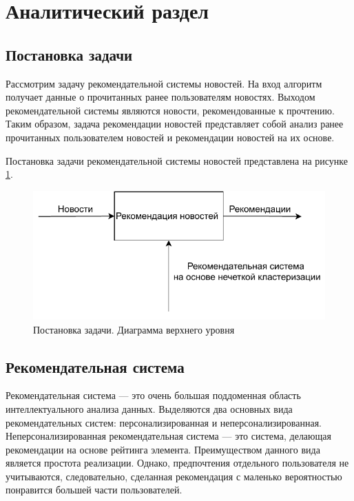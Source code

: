 \section{Аналитический раздел}
 
\subsection{Постановка задачи}

Рассмотрим задачу рекомендательной системы новостей. На вход алгоритм получает данные о прочитанных ранее пользователям новостях. Выходом рекомендательной системы являются новости, рекомендованные к прочтению. Таким образом, задача рекомендации новостей представляет собой анализ ранее прочитанных пользователем новостей и рекомендации новостей на их основе.

Постановка задачи рекомендательной системы новостей представлена на рисунке \ref{idef0_small}. 

\begin{figure}[H]
	\centering
	\includegraphics[width=\textwidth]{img/idef0_small.pdf}
	\caption{Постановка задачи. Диаграмма верхнего уровня}
	\label{idef0_small}
\end{figure}  

\subsection{Рекомендательная система}

Рекомендательная система — это очень большая поддоменная область интеллектуального анализа данных. Выделяются два основных вида рекомендательных систем: персонализированная и неперсонализированная. Неперсонализированная рекомендательная система — это система, делающая рекомендации на основе рейтинга элемента. Преимуществом данного вида является простота реализации. Однако, предпочтения отдельного пользователя не учитываются, следовательно, сделанная рекомендация с маленько вероятностью понравится большей части пользователей.

